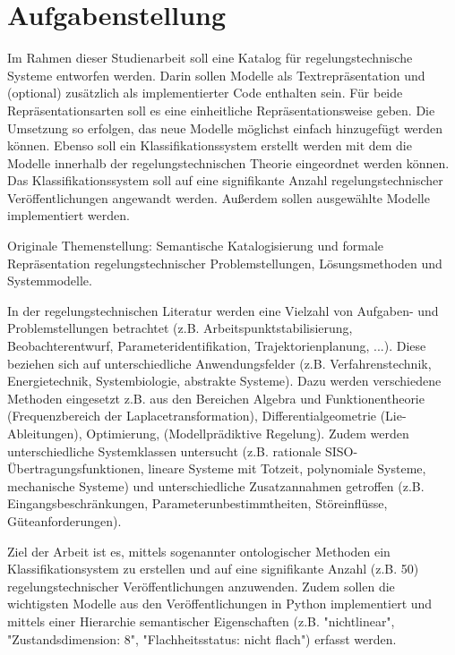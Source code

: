 \chapter{Aufgabenstellung}
Im Rahmen dieser Studienarbeit soll eine Katalog für regelungstechnische Systeme entworfen werden. Darin sollen Modelle als Textrepräsentation und (optional) zusätzlich als implementierter Code enthalten sein. Für beide Repräsentationsarten soll es eine einheitliche Repräsentationsweise geben. Die Umsetzung so erfolgen, das neue Modelle möglichst einfach hinzugefügt werden können. Ebenso soll ein Klassifikationssystem erstellt werden mit dem die Modelle innerhalb der regelungstechnischen Theorie eingeordnet werden können. Das Klassifikationssystem soll auf eine signifikante Anzahl regelungstechnischer Veröffentlichungen angewandt werden. Außerdem sollen ausgewählte  Modelle implementiert werden.

Originale Themenstellung:
Semantische Katalogisierung und formale Repräsentation regelungstechnischer Problemstellungen, Lösungsmethoden und Systemmodelle.

In der regelungstechnischen Literatur werden eine Vielzahl von Aufgaben- und Problemstellungen betrachtet (z.B. Arbeitspunktstabilisierung, Beobachterentwurf, Parameteridentifikation, Trajektorienplanung, ...). Diese beziehen sich auf unterschiedliche Anwendungsfelder (z.B. Verfahrenstechnik, Energietechnik, Systembiologie, abstrakte Systeme). Dazu werden verschiedene Methoden eingesetzt z.B. aus den Bereichen Algebra und Funktionentheorie (Frequenzbereich der Laplacetransformation), Differentialgeometrie (Lie-Ableitungen), Optimierung, (Modellprädiktive Regelung). Zudem werden unterschiedliche Systemklassen untersucht (z.B. rationale SISO-Übertragungsfunktionen, lineare Systeme mit Totzeit, polynomiale Systeme, mechanische Systeme) und unterschiedliche Zusatzannahmen getroffen (z.B. Eingangsbeschränkungen, Parameterunbestimmtheiten, Störeinflüsse, Güteanforderungen).

Ziel der Arbeit ist es, mittels sogenannter ontologischer Methoden ein Klassifikationsystem zu erstellen und auf eine signifikante Anzahl (z.B. 50) regelungstechnischer Veröffentlichungen anzuwenden. Zudem sollen die wichtigsten Modelle aus den Veröffentlichungen in Python implementiert und mittels einer Hierarchie semantischer Eigenschaften (z.B. "nichtlinear", "Zustandsdimension: 8", "Flachheitsstatus: nicht flach") erfasst werden.
